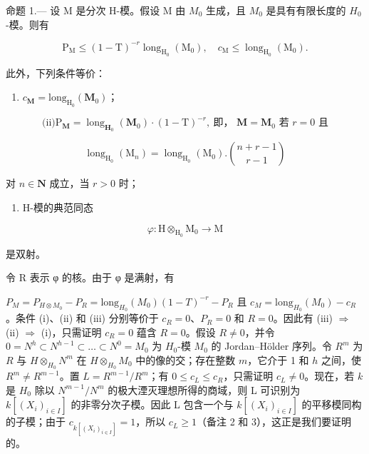 命题 1.--- 设 M 是分次 H-模。假设 M 由 \(M_{0}\) 生成，且 \(M_{0}\) 是具有有限长度的 \(H_{0}\)-模。则有

\[
\mathrm{P} _ {\mathrm{M}} \leqslant (1 - \mathrm{T}) ^ {- r} \operatorname{long} _ {\mathrm{H} _ {0}} (\mathrm{M} _ {0}), \quad c _ {\mathrm{M}} \leqslant \operatorname{long} _ {\mathrm{H} _ {0}} (\mathrm{M} _ {0}).
\]

此外，下列条件等价：

\begin{enumerate}
\def\labelenumi{(\roman{enumi})}
\tightlist
\item
  \(c_{\mathbf{M}} = \mathrm{long}_{\mathrm{H_0}}(\mathbf{M}_0)\)；
\end{enumerate}

\[
\text{(ii)} \mathrm{P}_{\mathbf{M}} = \operatorname{long}_{\mathbf{H}_{0}}(\mathbf{M}_{0}) \cdot (1 - \mathrm{T})^{-r},\ \text{即， }\mathbf{M} = \mathbf{M}_{0}\text{ 若 }r=0\text{ 且}
\]

\[
\operatorname{long} _ {\mathrm{H} _ {0}} \left(\mathrm{M} _ {n}\right) = \operatorname{long} _ {\mathrm{H} _ {0}} \left(\mathrm{M} _ {0}\right). \binom {n + r - 1} {r - 1}
\]

对 \(n \in \mathbf{N}\) 成立，当 \(r > 0\) 时；

\begin{enumerate}
\def\labelenumi{(\roman{enumi})}
\setcounter{enumi}{2}
\tightlist
\item
  H-模的典范同态
\end{enumerate}

\[
\varphi : \mathrm{H} \otimes_ {\mathrm{H} _ {0}} \mathrm{M} _ {0} \rightarrow \mathrm{M}
\]

是双射。

令 R 表示 φ 的核。由于 φ 是满射，有

\(P_{M} = P_{H \otimes M_{0}} - P_{R} = \text{long}_{H_{0}}(M_{0})(1 - T)^{-r} - P_{R}\) 且 \(c_{M} = \text{long}_{H_{0}}(M_{0}) - c_{R}\)。条件 (i)、(ii) 和 (iii) 分别等价于 \(c_{R} = 0\)、\(P_{R} = 0\) 和 \(R = 0\)。因此有 (iii) \(\Rightarrow\) (ii) \(\Rightarrow\) (i)，只需证明 \(c_{R} = 0\) 蕴含 \(R = 0\)。假设 \(R \neq 0\)，并令 \(0 = N^{h} \subset N^{h-1} \subset \ldots \subset N^{0} = M_{0}\) 为 \(H_{0}\)-模 \(M_{0}\) 的 Jordan–Hölder 序列。令 \(R^{m}\) 为 \(R\) 与 \(H \otimes_{H_{0}} N^{m}\) 在 \(H \otimes_{H_{0}} M_{0}\) 中的像的交；存在整数 \(m\)，它介于 1 和 \(h\) 之间，使 \(R^{m} \neq R^{m-1}\)。置 \(L = R^{m-1}/R^{m}\)；有 \(0 \leqslant c_{L} \leqslant c_{R}\)，只需证明 \(c_{L} \neq 0\)。现在，若 \(k\) 是 \(H_{0}\) 除以 \(N^{m-1}/N^{m}\) 的极大湮灭理想所得的商域，则 L 可识别为 \(k[(X_{i})_{i\in I}]\) 的非零分次子模。因此 L 包含一个与 \(k[(X_{i})_{i\in I}]\) 的平移模同构的子模；由于 \(c_{k[(X_{i})_{i\in I}]} = 1\)，所以 \(c_{L} \geqslant 1\)（备注 2 和 3），这正是我们要证明的。

